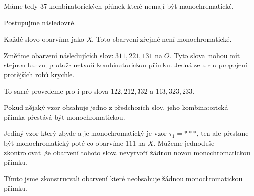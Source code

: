 \documentclass[../main.tex]{subfiles}
\begin{document}
Máme tedy 37 kombinatorických přímek které nemají být monochromatické.


Postupujme následovně.

Každé slovo obarvíme jako $X$. Toto obarvení zřejmě není monochromatické.

Změňme obarvení následujících slov: $311,221, 131$ na $O$. 
Tyto slova mohou mít stejnou barvu, protože netvoří kombinatorickou přímku. 
Jedná se ale o propojení protějších rohů krychle. 

To samé provedeme pro i pro slova $122, 212, 332$ a $113, 323, 233$.

Pokud nějaký vzor obsahuje jedno z předchozích slov, jeho kombinatorická přímka přestává být monochromatickou.

Jediný vzor který zbyde a je monochromatický je vzor $\tau_1 = * * *$, 
ten ale přestane být monochromatický poté co  
obarvíme $111$ na $X$. Můžeme jednoduše zkontrolovat ,že obarvení tohoto slova
nevytvoří žádnou novou monochromatickou přímku. 



Tímto jsme zkonstruovali obarvení které neobsahuje žádnou monochromatickou přímku. 
\end{document}

